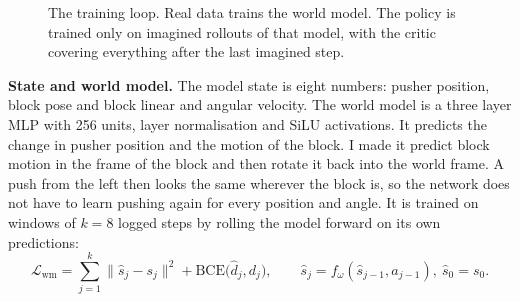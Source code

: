 \documentclass[11pt,a4paper]{article}
\begin{document}
\begin{figure}[htbp]
\centering
{}
\caption{The training loop. Real data trains the world model. The policy is trained only on imagined
rollouts of that model, with the critic covering everything after the last imagined step.}
\label{fig:loop}
\end{figure}

\textbf{State and world model.} The model state is eight numbers: pusher position, block pose and
block linear and angular velocity. The world model is a three layer MLP with 256 units, layer
normalisation and SiLU activations. It predicts the change in pusher position and the motion of the
block. I made it predict block motion in the frame of the block and then rotate it back into the
world frame. A push from the left then looks the same wherever the block is, so the network does not
have to learn pushing again for every position and angle. It is trained on windows of $k=8$ logged
steps by rolling the model forward on its own predictions:
\begin{equation}
  \mathcal{L}_{\text{wm}} = \sum_{j=1}^{k} \big\lVert \hat s_j - s_j \big\rVert^2
  + \mathrm{BCE}\big(\hat d_j, d_j\big),
  \qquad \hat s_{j} = f_\omega(\hat s_{j-1}, a_{j-1}),\ \hat s_0 = s_0 .
\end{equation}
\end{document}
